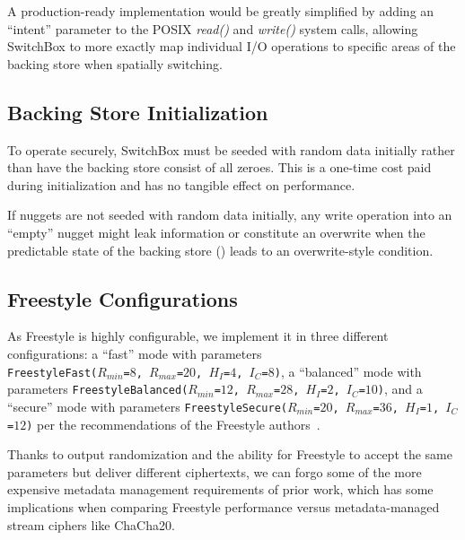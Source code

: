 A production-ready implementation would be greatly simplified by adding an
``intent'' parameter to the POSIX \textit{read()} and \textit{write()} system
calls, allowing SwitchBox to more exactly map individual I/O operations to
specific areas of the backing store when spatially switching. 

\subsection{Backing Store Initialization}

To operate securely, SwitchBox must be seeded with random data initially rather
than have the backing store consist of all zeroes. This is a one-time cost paid
during initialization and has no tangible effect on performance.

If nuggets are not seeded with random data initially, any write operation into
an ``empty'' nugget might leak information or constitute an overwrite when the
predictable state of the backing store () leads to
an overwrite-style condition.

\subsection{Freestyle Configurations}

As Freestyle is highly configurable, we implement it in three different
configurations: a ``fast'' mode with parameters
\\\texttt{FreestyleFast($R_{min}$=$8$, $R_{max}$=$20$, $H_I$=$4$, $I_C$=$8$)}, a
``balanced'' mode with parameters \texttt{FreestyleBalanced($R_{min}$=$12$,
$R_{max}$=$28$, $H_I$=$2$, $I_C$=$10$)}, and a ``secure'' mode with parameters
\texttt{FreestyleSecure($R_{min}$=$20$, $R_{max}$=$36$, $H_I$=$1$,
$I_C$=$12$)} per the recommendations of the Freestyle authors~\cite{Freestyle}.

Thanks to output randomization and the ability for Freestyle to accept the same
parameters but deliver different ciphertexts, we can forgo some of the more
expensive metadata management requirements of prior work, which has some
implications when comparing Freestyle performance versus metadata-managed stream
ciphers like ChaCha20.
